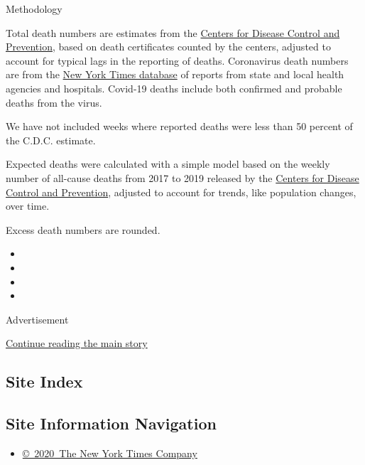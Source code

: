 Methodology

Total death numbers are estimates from the
\href{https://www.cdc.gov/nchs/nvss/vsrr/covid19/excess_deaths.htm}{Centers
for Disease Control and Prevention}, based on death certificates counted
by the centers, adjusted to account for typical lags in the reporting of
deaths. Coronavirus death numbers are from the
\href{https://www.nytimes3xbfgragh.onion/interactive/2020/us/coronavirus-us-cases.html}{New
York Times database} of reports from state and local health agencies and
hospitals. Covid-19 deaths include both confirmed and probable deaths
from the virus.

We have not included weeks where reported deaths were less than 50
percent of the C.D.C. estimate.

Expected deaths were calculated with a simple model based on the weekly
number of all-cause deaths from 2017 to 2019 released by the
\href{https://www.cdc.gov/nchs/nvss/vsrr/covid19/index.htm}{Centers for
Disease Control and Prevention}, adjusted to account for trends, like
population changes, over time.

Excess death numbers are rounded.

\begin{itemize}
\item
\item
\item
\item
\end{itemize}

Advertisement

\protect\hyperlink{after-bottom}{Continue reading the main story}

\hypertarget{site-index}{%
\subsection{Site Index}\label{site-index}}

\hypertarget{site-information-navigation}{%
\subsection{Site Information
Navigation}\label{site-information-navigation}}

\begin{itemize}
\tightlist
\item
  \href{https://help.nytimes3xbfgragh.onion/hc/en-us/articles/115014792127-Copyright-notice}{©~2020~The
  New York Times Company}
\end{itemize}

